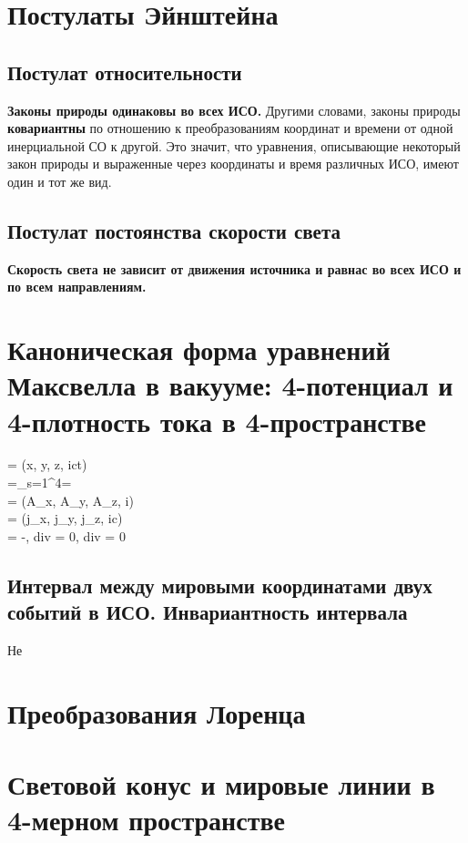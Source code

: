 \documentclass[10pt,landscape,a4paper]{article}
\let\bar\overline
\begin{document}
	\small
	\begin{multicols*}{5}
		\section{Постулаты Эйнштейна}
		\subsection{Постулат относительности}
		\textbf{Законы природы одинаковы во всех ИСО.} Другими словами, законы природы \textbf{ковариантны} по отношению к преобразованиям координат и времени от одной инерциальной СО к другой. Это значит, что уравнения, описывающие некоторый закон природы и выраженные через координаты и время различных ИСО, имеют один и тот же вид.
		\subsection{Постулат постоянства скорости света}
		\textbf{Скорость света не зависит от движения источника и равнас во всех ИСО и по всем направлениям.}
		
		\section{Каноническая форма уравнений Максвелла в вакууме: 4-потенциал и 4-плотность тока в 4-пространстве}
		\begin{fralign*}
			\bar{x} = \left(x, y, z, ict\right) \\
			\Delta {}=\sum\limits_{s=1}^4=\Box  \\
			\bar{A} = \left(A_x, A_y, A_z, i\phi\right)  \\ 
			\bar{J} = \left(j_x, j_y, j_z, ic\rho\right)   \\
			\Box \bar{A} = -\bar{j}, div{\bar{A}} = 0, div{\bar{J}} = 0 
		\end{fralign*}
		
		\subsection*{Интервал между мировыми координатами двух событий в ИСО. Инвариантность интервала}
		Не
		\section{Преобразования Лоренца}
		\section{Световой конус и мировые линии в 4-мерном пространстве}

\end{multicols*}
\end{document}
